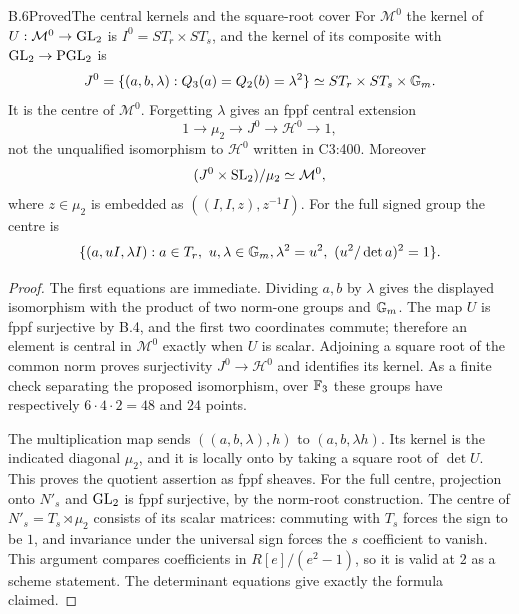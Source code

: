\begin{statement}{B.6}{Proved}{The central kernels and the square-root cover}
For $\mathcal M^0$ the kernel of $U:\mathcal M^0\to\operatorname{GL}_2$
is $I^0=ST_r\times ST_s$, and the kernel of its composite
with $\operatorname{GL}_2\to\operatorname{PGL}_2$ is
\[
 J^0=\{(a,b,\lambda):Q_3(a)=Q_2(b)=\lambda^2\}
 \simeq ST_r\times ST_s\times\mathbb G_m.
\]
It is the centre of $\mathcal M^0$. Forgetting $\lambda$
gives an fppf central extension
\[
 1\to\mu_2\to J^0\to\mathcal H^0\to1,
\]
not the unqualified isomorphism to $\mathcal H^0$ written
in C3:400. Moreover
\[
 (J^0\times\operatorname{SL}_2)/\mu_2\simeq\mathcal M^0,
\]
where $z\in\mu_2$ is embedded as $((I,I,z),z^{-1}I)$.
For the full signed group the centre is
\[
 \{(a,uI,\lambda I):a\in T_r,\ u,\lambda\in\mathbb G_m,
   \lambda^2=u^2,\ (u^2/\det a)^2=1\}.
\]
\end{statement}
\begin{proof}
The first equations are immediate. Dividing $a,b$ by
$\lambda$ gives the displayed isomorphism with the product
of two norm-one groups and $\mathbb G_m$. The map $U$ is fppf
surjective by B.4, and the first two coordinates commute;
therefore an element is central in $\mathcal M^0$ exactly
when $U$ is scalar. Adjoining a square root of the common
norm proves surjectivity $J^0\to\mathcal H^0$ and identifies
its kernel. As a finite check separating the proposed
isomorphism, over $\mathbb F_3$ these groups have respectively
$6\cdot4\cdot2=48$ and $24$ points.

The multiplication map sends $((a,b,\lambda),h)$ to
$(a,b,\lambda h)$. Its kernel is the indicated diagonal
$\mu_2$, and it is locally onto by taking a square root of
$\det U$. This proves the quotient assertion as fppf sheaves.
For the full centre, projection onto $N'_s$ and $\operatorname{GL}_2$
is fppf surjective, by the norm-root construction. The
centre of $N'_s=T_s\rtimes\mu_2$ consists of its scalar
matrices: commuting with $T_s$ forces the sign to be $1$,
and invariance under the universal sign forces the
$s$ coefficient to vanish. This argument compares
coefficients in $R[e]/(e^2-1)$, so it is valid at $2$ as
a scheme statement. The determinant equations give exactly
the formula claimed.
\end{proof}

